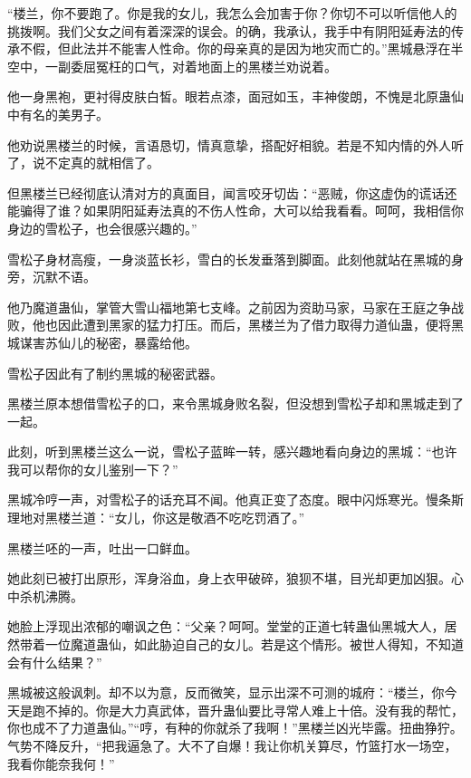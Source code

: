 
\begin{this_body}



“楼兰，你不要跑了。你是我的女儿，我怎么会加害于你？你切不可以听信他人的挑拨啊。我们父女之间有着深深的误会。的确，我承认，我手中有阴阳延寿法的传承不假，但此法并不能害人性命。你的母亲真的是因为地灾而亡的。”黑城悬浮在半空中，一副委屈冤枉的口气，对着地面上的黑楼兰劝说着。

他一身黑袍，更衬得皮肤白皙。眼若点漆，面冠如玉，丰神俊朗，不愧是北原蛊仙中有名的美男子。

他劝说黑楼兰的时候，言语恳切，情真意挚，搭配好相貌。若是不知内情的外人听了，说不定真的就相信了。

但黑楼兰已经彻底认清对方的真面目，闻言咬牙切齿：“恶贼，你这虚伪的谎话还能骗得了谁？如果阴阳延寿法真的不伤人性命，大可以给我看看。呵呵，我相信你身边的雪松子，也会很感兴趣的。”

雪松子身材高瘦，一身淡蓝长衫，雪白的长发垂落到脚面。此刻他就站在黑城的身旁，沉默不语。

他乃魔道蛊仙，掌管大雪山福地第七支峰。之前因为资助马家，马家在王庭之争战败，他也因此遭到黑家的猛力打压。而后，黑楼兰为了借力取得力道仙蛊，便将黑城谋害苏仙儿的秘密，暴露给他。

雪松子因此有了制约黑城的秘密武器。

黑楼兰原本想借雪松子的口，来令黑城身败名裂，但没想到雪松子却和黑城走到了一起。

此刻，听到黑楼兰这么一说，雪松子蓝眸一转，感兴趣地看向身边的黑城：“也许我可以帮你的女儿鉴别一下？”

黑城冷哼一声，对雪松子的话充耳不闻。他真正变了态度。眼中闪烁寒光。慢条斯理地对黑楼兰道：“女儿，你这是敬酒不吃吃罚酒了。”

黑楼兰呸的一声，吐出一口鲜血。

她此刻已被打出原形，浑身浴血，身上衣甲破碎，狼狈不堪，目光却更加凶狠。心中杀机沸腾。

她脸上浮现出浓郁的嘲讽之色：“父亲？呵呵。堂堂的正道七转蛊仙黑城大人，居然带着一位魔道蛊仙，如此胁迫自己的女儿。若是这个情形。被世人得知，不知道会有什么结果？”

黑城被这般讽刺。却不以为意，反而微笑，显示出深不可测的城府：“楼兰，你今天是跑不掉的。你是大力真武体，晋升蛊仙要比寻常人难上十倍。没有我的帮忙，你也成不了力道蛊仙。”“哼，有种的你就杀了我啊！”黑楼兰凶光毕露。扭曲狰狞。气势不降反升，“把我逼急了。大不了自爆！我让你机关算尽，竹篮打水一场空，我看你能奈我何！”


\end{this_body}
